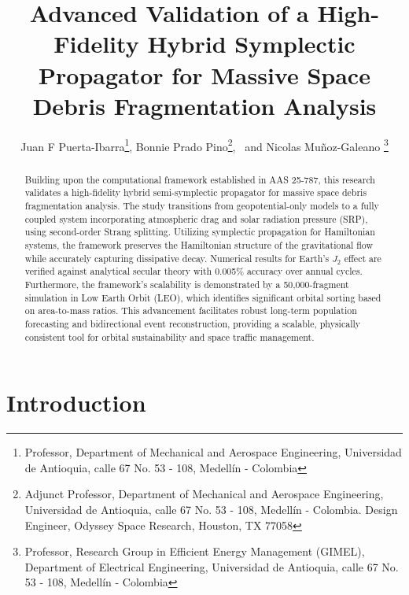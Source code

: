\documentclass[letterpaper,11pt]{AAS}
\begin{document}
\title{Advanced Validation of a High-Fidelity Hybrid Symplectic Propagator for Massive Space Debris Fragmentation Analysis}

\author{Juan F Puerta-Ibarra\thanks{Professor, Department of Mechanical and Aerospace Engineering, Universidad de Antioquia, calle 67 No. 53 - 108, Medellín - Colombia},  
Bonnie Prado Pino\thanks{Adjunct Professor, Department of Mechanical and Aerospace Engineering, Universidad de Antioquia, calle 67 No. 53 - 108, Medellín - Colombia. Design Engineer, Odyssey Space Research, Houston, TX 77058},
\ and Nicolas Muñoz-Galeano \thanks{Professor, Research Group in Efficient Energy Management (GIMEL), Department of Electrical Engineering, Universidad de Antioquia, calle 67 No. 53 - 108, Medellín - Colombia}
}

\maketitle

\begin{abstract}

Building upon the computational framework established in AAS 25-787\cite{puerta-ibarra_advanced_2025}, this research validates a high-fidelity hybrid semi-symplectic propagator for massive space debris fragmentation analysis. The study transitions from geopotential-only models to a fully coupled system incorporating atmospheric drag and solar radiation pressure (SRP), using second-order Strang splitting. Utilizing symplectic propagation for Hamiltonian systems, the framework preserves the Hamiltonian structure of the gravitational flow while accurately capturing dissipative decay. Numerical results for Earth's $J_2$ effect are verified against analytical secular theory with 0.005\% accuracy over annual cycles. Furthermore, the framework's scalability is demonstrated by a 50,000-fragment simulation in Low Earth Orbit (LEO), which identifies significant orbital sorting based on area-to-mass ratios. This advancement facilitates robust long-term population forecasting and bidirectional event reconstruction, providing a scalable, physically consistent tool for orbital sustainability and space traffic management.
\end{abstract}

\section{Introduction}
\end{document}
